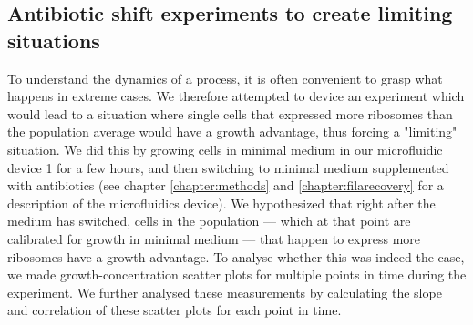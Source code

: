 \subsection{Antibiotic shift experiments to create limiting situations}
\label{section:ribo:shiftexperiments}


To understand the dynamics of a process, it is often convenient to grasp what happens in extreme cases.
%
We therefore attempted to device an experiment which would lead to a situation where single cells that expressed more ribosomes than the population average would have a growth advantage, thus forcing a "limiting" situation.
% 
We did this by growing cells in minimal medium in our microfluidic device 1 for a few hours, and then switching to minimal medium supplemented with antibiotics (see chapter \ref{chapter:methods} and \ref{chapter:filarecovery} for a description of the microfluidics device).
%
We hypothesized that right after the medium has switched, cells in the population --- which at that point are calibrated for growth in minimal medium --- that happen to express more ribosomes have a growth advantage.
%
To analyse whether this was indeed the case, we made growth-concentration scatter plots for multiple points in time during the experiment.
%
We further analysed these measurements by calculating the slope and correlation of these scatter plots for each point in time.


